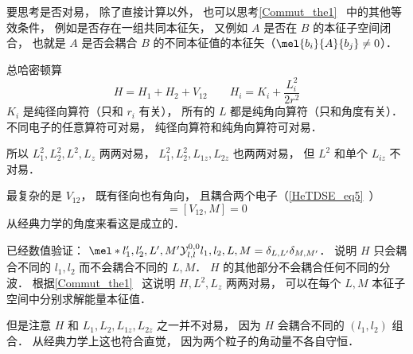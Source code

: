 
要思考是否对易， 除了直接计算以外， 也可以思考\autoref{Commut_the1}~ 中的其他等效条件， 例如是否存在一组共同本征矢， 又例如 $A$ 是否在 $B$ 的本征子空间闭合， 也就是 $A$ 是否会耦合 $B$ 的不同本征值的本征矢（$\mel{b_i}{A}{b_j} \ne 0$）．

总哈密顿算
\begin{equation}
H = H_1 + H_2 + V_{12} \qquad H_i = K_i + \frac{L_i^2}{2r^2}
\end{equation}
$K_i$ 是纯径向算符（只和 $r_i$ 有关）， 所有的 $L$ 都是纯角向算符（只和角度有关）． 不同电子的任意算符可对易， 纯径向算符和纯角向算符可对易．

所以 $L_1^2, L_2^2, L^2, L_z$ 两两对易， $L_1^2, L_2^2, L_{1z}, L_{2z}$ 也两两对易， 但 $L^2$ 和单个 $L_{iz}$ 不对易．

最复杂的是 $V_{12}$， 既有径向也有角向， 且耦合两个电子（\autoref{HeTDSE_eq5}~）
\begin{equation}
[V_{12}, L^2] = [V_{12}, M] = 0
\end{equation}
从经典力学的角度来看这是成立的．

已经数值验证： $\mel*{l'_1,l'_2,L',M'}{\mathcal Y_{l,l}^{0,0}}{l_1,l_2,L,M} = \delta_{L,L'}\delta_{M,M'}$． 说明 $H$ 只会耦合不同的 $l_1,l_2$ 而不会耦合不同的 $L,M$． $H$ 的其他部分不会耦合任何不同的分波． 根据\autoref{Commut_the1}~ 这说明 $H,L^2,L_z$ 两两对易， 可以在每个 $L,M$ 本征子空间中分别求解能量本征值．

但是注意 $H$ 和 $L_1, L_2, L_{1z}, L_{2z}$ 之一并不对易， 因为 $H$ 会耦合不同的 $(l_1,l_2)$ 组合． 从经典力学上这也符合直觉， 因为两个粒子的角动量不各自守恒．



